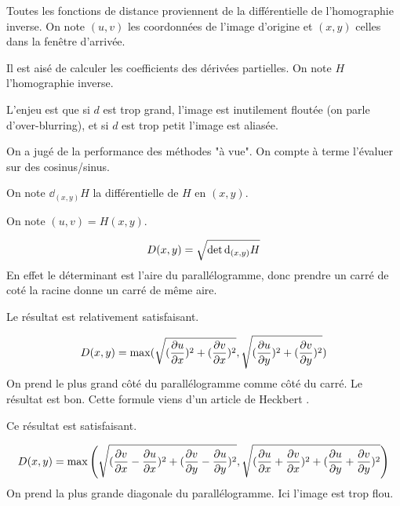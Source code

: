 

Toutes les fonctions de distance proviennent de la différentielle de l'homographie inverse.
On note $(u,v)$ les coordonnées de l'image d'origine et $(x,y)$ celles dans la fenêtre d'arrivée.

Il est aisé de calculer les coefficients des dérivées partielles. On note $H$ l'homographie inverse.


L'enjeu est que si $d$ est trop grand, l'image est inutilement floutée (on parle d'over-blurring), et si $d$ est trop petit l'image est aliasée.

On a jugé de la performance des méthodes "à vue". On compte à terme l'évaluer sur des cosinus/sinus.

On note $\dd_{(x,y)} H$ la différentielle de $H$ en $(x,y)$.

On note $(u,v)=H(x,y)$.

$$D(x,y) = \sqrt{\det \textrm{d}_{(x,y)} H}$$
En effet le déterminant est l'aire du parallélogramme, donc prendre un carré de coté la racine donne un carré de même aire.

Le résultat est relativement satisfaisant.


$$ D(x,y) = \max (\sqrt{(\frac{\partial u}{\partial x})^2 + (\frac{\partial v}{\partial x})^2},\sqrt{(\frac{\partial u}{\partial y})^2 + (\frac{\partial v}{\partial y})^2})$$
On prend le plus grand côté du parallélogramme comme côté du carré. Le résultat est bon. Cette formule viens d'un article de Heckbert \cite{heckbert1983texture}.

Ce résultat est satisfaisant.


$$D(x,y) = \max \left( \sqrt{(\frac{\partial v}{\partial x}-\frac{\partial  u}{\partial  x})^2+(\frac{\partial v}{\partial y}-\frac{\partial  u}{\partial y})^2}, \sqrt{(\frac{\partial u}{\partial x}+\frac{\partial  v}{\partial  x})^2+(\frac{\partial u}{\partial y}+\frac{\partial  v}{\partial  y})^2} \right)$$
On prend la plus grande diagonale du parallélogramme. Ici l'image est trop flou.



